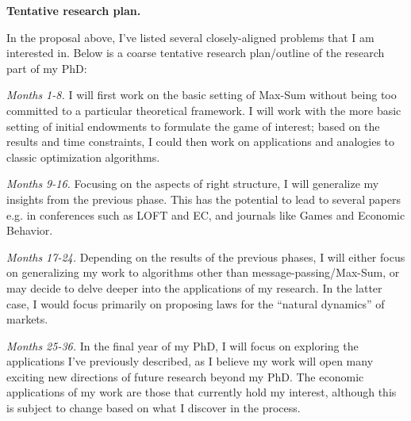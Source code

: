 \documentclass{article}
\newcommand{\statement}[1]{\par\medskip
  {\textbf{#1.}}\space
}
\newcommand{\substatement}[1]{\par\medskip
  {\emph{#1.}}\space
}
\begin{document}
\statement{Tentative research plan}

In the proposal above, I've listed several closely-aligned problems that I am interested in. Below is a coarse tentative research plan/outline of the research part of my PhD:


\substatement{Months 1-8} I will first work on the basic setting of Max-Sum without being too committed to a particular theoretical framework. I will work with the more basic setting of initial endowments to formulate the game of interest; based on the results and time constraints, I could then work on applications and analogies to classic optimization algorithms.

\substatement{Months 9-16} Focusing on the aspects of right structure, I will generalize my insights from the previous phase. This has the potential to lead to several papers e.g. in conferences such as LOFT and EC, and journals like Games and Economic Behavior.

\substatement{Months 17-24} Depending on the results of the previous phases, I will either focus on generalizing my work to algorithms other than message-passing/Max-Sum, or may decide to delve deeper into the applications of my research. In the latter case, I would focus primarily on proposing laws for the ``natural dynamics'' of markets.

\substatement{Months 25-36} In the final year of my PhD, I will focus on exploring the applications I've previously described, as I believe my work will open many exciting new directions of future research beyond my PhD. The economic applications of my work are those that currently hold my interest, although this is subject to change based on what I discover in the process.

%
%
\printbibliography
\end{document}
